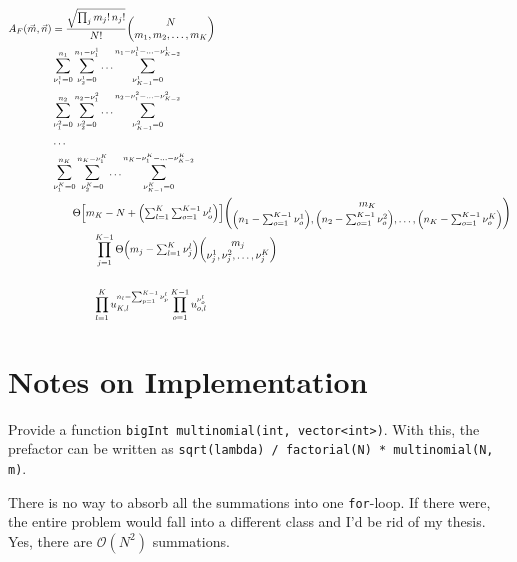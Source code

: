 \documentclass[
	english,
	a4paper,
	fontsize=10pt,
	parskip=half,
	titlepage=true,
	DIV=12,
	final
]{scrreprt}
\begin{document}
\begin{align}
\nonumber
	A_F(\vec{m}, \vec{n})
&=
	\frac
		{\sqrt{\prod_j m_j! \, n_j!}}
		{N!}
	\mqty(
		N \\
		m_1, m_2, \ldots, m_K
	) \\ 
\nonumber
&	\sum_{\nu_1^1 = 0}^{n_1}
	\sum_{\nu_2^1 = 0}^{n_1 - \nu_1^1}
	\ldots
	\sum_{\nu_{K-1}^1 = 0}^{n_1 - \nu_1^1 - \ldots - \nu_{K-2}^1} \\
\nonumber
&	\sum_{\nu_1^2 = 0}^{n_2}
	\sum_{\nu_2^2 = 0}^{n_2 - \nu_1^2}
	\ldots
	\sum_{\nu_{K-1}^2 = 0}^{n_2 - \nu_1^2 - \ldots - \nu_{K-2}^2} \\
\nonumber
&	\ldots \\
\nonumber
&	\sum_{\nu_1^K = 0}^{n_K}
	\sum_{\nu_2^K = 0}^{n_K - \nu_1^K}
	\ldots
	\sum_{\nu_{K-1}^K = 0}^{n_K - \nu_1^K - \ldots - \nu_{K-2}^K} \\
\nonumber
&\qquad
		\Theta\qty[
			m_K - N + 
			{\textstyle \qty(
					\sum_{l=1}^{K}
					\sum_{o=1}^{K-1} \nu_o^l
			)}
		]
		\mqty(
			m_K \\
			\qty(n_1 - {
				\textstyle \sum_{o=1}^{K-1} \nu_o^1
			}),
			\qty(n_2 - {
				\textstyle \sum_{o=1}^{K-1} \nu_o^2
			}),
			\ldots,
			\qty(n_K - {
				\textstyle \sum_{o=1}^{K-1} \nu_o^K
			})
		) \\
\nonumber
&\qquad\qquad
	\prod_{j=1}^{K-1}
		\Theta\qty(
			m_j -
			 {\textstyle \sum_{l=1}^{K} \nu_j^l}
		)
		\mqty(
			m_j \\
			\nu_j^1, \nu_j^2, \ldots, \nu_j^K
		) \\
\nonumber
&\qquad\qquad \\
&\qquad\qquad
	\prod_{l=1}^K 
		u_{K,l}^{n_l - \sum_{p=1}^{K-1} \nu_p^l}
		\prod_{o=1}^{K-1}
			u_{o,l}^{\nu_o^l}
\end{align}


\section{Notes on Implementation}
Provide a function \texttt{bigInt multinomial(int, vector<int>)}. With this, the prefactor can be written as \texttt{sqrt(lambda) / factorial(N) * multinomial(N, m)}.

There is no way to absorb all the summations into one \texttt{for}-loop. If there were, the entire problem would fall into a different class and I'd be rid of my thesis. Yes, there are $\mathcal{O}(N^2)$ summations.
\end{document}
